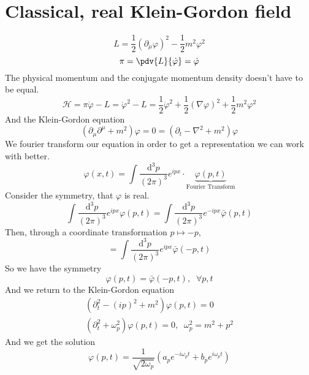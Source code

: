 \documentclass[]{scrartcl}
\begin{document}
\section{Classical, real Klein-Gordon field}
\begin{equation}
	L = \frac{1}{2}(\partial_\mu\varphi)^2 - \frac{1}{2}m^2\varphi^2
\end{equation}
\begin{equation}
	\pi = \pdv{L}{\dot\varphi} = \dot\varphi
\end{equation}
The physical momentum and the conjugate momentum density doesn't have to be equal.
\begin{equation}
	\mathcal{H} = \pi\dot\varphi - L = \dot\varphi^2 - L = \frac{1}{2}\dot\varphi^2 + \frac{1}{2}(\nabla\varphi)^2 + \frac{1}{2}m^2\varphi^2
\end{equation}
And the Klein-Gordon equation
\begin{equation}
	(\partial_\mu\partial^\mu + m^2)\varphi = 0 = (\partial_t - \nabla^2 + m^2)\varphi
\end{equation}
We fourier transform our equation in order to get a representation we can work with better.
\begin{equation}
	\varphi(x,t) = \int \frac{\text{d}^3p}{(2\pi)^3}e^{ipx}\cdot\underbrace{\varphi(p,t)}_{\text{Fourier Transform}}
\end{equation}
Consider the symmetry, that $\varphi$ is real.
\begin{equation}
	\int \frac{\text{d}^3p}{(2\pi)^3}e^{ipx}\varphi(p,t) = \int \frac{\text{d}^3p}{(2\pi)^3}e^{-ipx}\bar\varphi(p,t)
\end{equation}
Then, through a coordinate transformation $p\mapsto -p$,
\begin{equation}
	= \int \frac{\text{d}^3p}{(2\pi)^3}e^{ipx}\bar\varphi(-p,t)
\end{equation}
So we have the symmetry
\begin{equation}
	\varphi(p,t) = \bar\varphi(-p,t),\;\; \forall p,t
\end{equation}
And we return to the Klein-Gordon equation
\begin{gather}
	(\partial_t^2 - (ip)^2 + m^2)\varphi(p,t) = 0\\
	(\partial_t^2 + \omega_p^2)\varphi(p,t) = 0,\;\;\omega_p^2 = m^2+p^2
\end{gather}
And we get the solution
\begin{equation}
	\varphi(p,t) = \frac{1}{\sqrt{2\omega_p}}\left(a_pe^{-i\omega_p t} + b_p e^{i\omega_p t}\right)
\end{equation}
\end{document}

